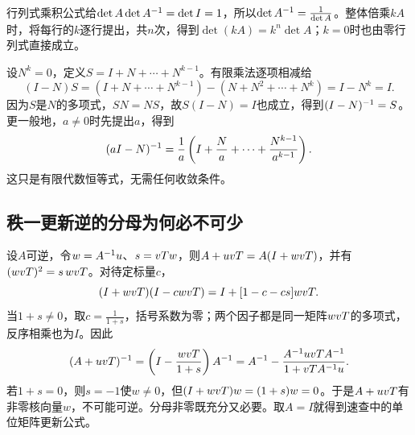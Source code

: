 行列式乘积公式给$\det A\det A^{-1}=\det I=1$，所以$\det A^{-1}=\frac{1}{\det A}$。整体倍乘$kA$时，将每行的$k$逐行提出，共$n$次，得到$\det(kA)=k^n\det A$；$k=0$时也由零行列式直接成立。

设$N^k=0$，定义$S=I+N+\cdots+N^{k-1}$。有限乘法逐项相减给
\[
(I-N)S=(I+N+\cdots+N^{k-1})-(N+N^2+\cdots+N^k)=I-N^k=I.
\]
因为$S$是$N$的多项式，$SN=NS$，故$S(I-N)=I$也成立，得到$(I-N)^{-1}=S$。更一般地，$a\ne0$时先提出$a$，得到
\[
(aI-N)^{-1}=\dfrac1a\left(I+\dfrac Na+\cdots+\dfrac{N^{k-1}}{a^{k-1}}\right).
\]
这只是有限代数恒等式，无需任何收敛条件。

\subsection{秩一更新逆的分母为何必不可少}\label{der:rank-one-inverse}
设$A$可逆，令$w=A^{-1} u$、$s=vT w$，则$A+uvT=A(I+wvT)$，并有$(wvT)^2=s\,wvT$。对待定标量$c$，
\[
(I+wvT)(I-cwvT)=I+[1-c-cs]wvT.
\]
当$1+s\ne0$，取$c=\frac{1}{1+s}$，括号系数为零；两个因子都是同一矩阵$wvT$的多项式，反序相乘也为$I$。因此
\[
(A+uvT)^{-1}
=\left(I-\dfrac{wvT}{1+s}\right)A^{-1}
=A^{-1}-\dfrac{A^{-1} uvT A^{-1}}{1+vT A^{-1} u}.
\]
若$1+s=0$，则$s=-1$使$w\ne0$，但$(I+wvT)w=(1+s)w=0$。于是$A+uvT$有非零核向量$w$，不可能可逆。分母非零既充分又必要。取$A=I$就得到速查中的单位矩阵更新公式。

